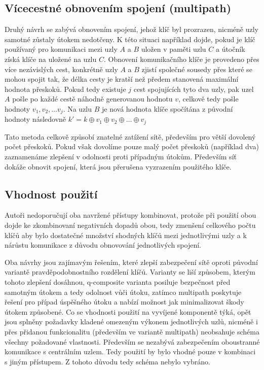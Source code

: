 \documentclass[11pt,final,twoside]{fithesis2}
\begin{document}
\subsection{Vícecestné obnovením spojení (multipath)}
Druhý návrh se zabývá obnovením spojení, jehož klíč byl prozrazen, nicméně uzly samotné zůstaly útokem nedotčeny. K této situaci například dojde, pokud je klíč používaný pro komunikaci mezi
uzly $A$ a $B$ uložen v paměti uzlu $C$ a útočník získá klíče na uložené na uzlu $C$. Obnovení komunikačního klíče je provedeno přes více nezávislých cest, konkrétně uzly $A$ a $B$ zjistí společné sousedy
přes které se mohou spojit tak, že délka cesty je kratší než předem stanovená maximální hodnota přeskoků. Pokud tedy existuje $j$ cest spojujících tyto dva uzly, pak uzel $A$ pošle po každé cestě náhodně 
generovanou hodnotu $v$, celkově tedy pošle hodnoty $v_1, v_2, \dots v_j$. Na uzlu $B$ je nová hodnota klíče spočítána z původní hodnoty následovně $k' = k \oplus v_1 \oplus v_2 \oplus \dots \oplus v_j$

Tato metoda celkově způsobí znatelné zatížení sítě, především pro větší dovolený počet přeskoků. Pokud však dovolíme pouze malý počet přeskoků (například dva) zaznamenáme zlepšení v odolnosti proti 
případným útokům. Především síť dokáže obnovit spojení, která jsou přerušena vyzrazením použitého klíče.

\subsection{Vhodnost použití}
Autoři nedoporučují oba navržené přístupy kombinovat, protože při použití obou dojde ke zkombinovaní negativních dopadů obou, tedy zmenšení celkového počtu klíčů aby bylo dostatečné množství shodných
klíčů mezi jednotlivými uzly a k nárůstu komunikace z důvodu obnovování jednotlivých spojení. 

Oba návrhy jsou zajímavým řešením, které zlepší zabezpečení sítě oproti původní variantě pravděpodobnostního rozdělení klíčů. Varianty se liší způsobem, kterým tohoto zlepšení dosáhnou, q-composite 
varianta posiluje bezpečnost před samotným útokem a tedy odolnost vůči útoku, zatímco multipath poskytuje řešení pro případ úspěšného útoku a nabízí možnost jak minimalizovat škody útokem způsobené.
Co se vhodnosti použití na vyvíjené komponentě týká, opět jsou splněny požadavky kladené omezeným výkonem jednotlivých uzlů, nicméně i přes přidanou funkcionalitu (především ve 
variantě multipath) neobsahuje schéma všechny požadované vlastnosti. Především se nezabývá zabezpečením oboustranné komunikace s centrálním uzlem. Tedy použití by bylo vhodné pouze v kombinaci 
s jiným přístupem. Z tohoto důvodu tedy schéma nebylo vybráno. 
\end{document}
